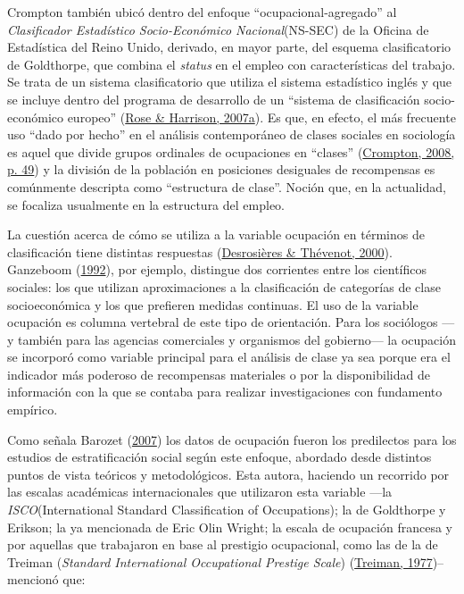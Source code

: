 \documentclass[
]{article}
\begin{document}
Crompton también ubicó dentro del enfoque ``ocupacional-agregado'' al \emph{Clasificador Estadístico Socio-Económico Nacional}(NS-SEC) de la Oficina de Estadística del Reino Unido, derivado, en mayor parte, del esquema clasificatorio de Goldthorpe, que combina el \emph{status} en el empleo con características del trabajo. Se trata de un sistema clasificatorio que utiliza el sistema estadístico inglés y que se incluye dentro del programa de desarrollo de un ``sistema de clasificación socio-económico europeo'' (\protect\hyperlink{ref-Rose2007}{Rose \& Harrison, 2007a}). Es que, en efecto, el más frecuente uso ``dado por hecho'' en el análisis contemporáneo de clases sociales en sociología es aquel que divide grupos ordinales de ocupaciones en ``clases'' (\protect\hyperlink{ref-Crompton2008}{Crompton, 2008, p. 49}) y la división de la población en posiciones desiguales de recompensas es comúnmente descripta como ``estructura de clase''. Noción que, en la actualidad, se focaliza usualmente en la estructura del empleo.

La cuestión acerca de cómo se utiliza a la variable ocupación en términos de clasificación tiene distintas respuestas (\protect\hyperlink{ref-Desrosieres2000}{Desrosières \& Thévenot, 2000}). Ganzeboom (\protect\hyperlink{ref-Ganzeboom1992}{1992}), por ejemplo, distingue dos corrientes entre los científicos sociales: los que utilizan aproximaciones a la clasificación de categorías de clase socioeconómica y los que prefieren medidas continuas. El uso de la variable ocupación es columna vertebral de este tipo de orientación. Para los sociólogos ---y también para las agencias comerciales y organismos del gobierno--- la ocupación se incorporó como variable principal para el análisis de clase ya sea porque era el indicador más poderoso de recompensas materiales o por la disponibilidad de información con la que se contaba para realizar investigaciones con fundamento empírico.

Como señala Barozet (\protect\hyperlink{ref-Barozet2007}{2007}) los datos de ocupación fueron los predilectos para los estudios de estratificación social según este enfoque, abordado desde distintos puntos de vista teóricos y metodológicos. Esta autora, haciendo un recorrido por las escalas académicas internacionales que utilizaron esta variable ---la \emph{ISCO}(International Standard Classification of Occupations); la de Goldthorpe y Erikson; la ya mencionada de Eric Olin Wright; la escala de ocupación francesa y por aquellas que trabajaron en base al prestigio ocupacional, como las de la de Treiman (\emph{Standard International Occupational Prestige Scale}) (\protect\hyperlink{ref-Treiman1977}{Treiman, 1977})-- mencionó que:
\end{document}
